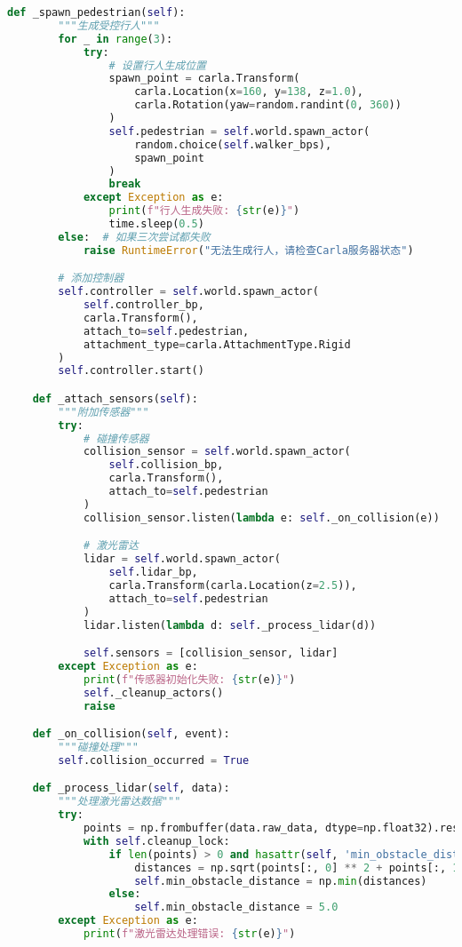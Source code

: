 \begin{lstlisting}[language=Python]
    def _spawn_pedestrian(self):
        """生成受控行人"""
        for _ in range(3):
            try:
                # 设置行人生成位置
                spawn_point = carla.Transform(
                    carla.Location(x=160, y=138, z=1.0),
                    carla.Rotation(yaw=random.randint(0, 360))
                )
                self.pedestrian = self.world.spawn_actor(
                    random.choice(self.walker_bps),
                    spawn_point
                )
                break
            except Exception as e:
                print(f"行人生成失败: {str(e)}")
                time.sleep(0.5)
        else:  # 如果三次尝试都失败
            raise RuntimeError("无法生成行人，请检查Carla服务器状态")

        # 添加控制器
        self.controller = self.world.spawn_actor(
            self.controller_bp,
            carla.Transform(),
            attach_to=self.pedestrian,
            attachment_type=carla.AttachmentType.Rigid
        )
        self.controller.start()

    def _attach_sensors(self):
        """附加传感器"""
        try:
            # 碰撞传感器
            collision_sensor = self.world.spawn_actor(
                self.collision_bp,
                carla.Transform(),
                attach_to=self.pedestrian
            )
            collision_sensor.listen(lambda e: self._on_collision(e))

            # 激光雷达
            lidar = self.world.spawn_actor(
                self.lidar_bp,
                carla.Transform(carla.Location(z=2.5)),
                attach_to=self.pedestrian
            )
            lidar.listen(lambda d: self._process_lidar(d))

            self.sensors = [collision_sensor, lidar]
        except Exception as e:
            print(f"传感器初始化失败: {str(e)}")
            self._cleanup_actors()
            raise

    def _on_collision(self, event):
        """碰撞处理"""
        self.collision_occurred = True

    def _process_lidar(self, data):
        """处理激光雷达数据"""
        try:
            points = np.frombuffer(data.raw_data, dtype=np.float32).reshape(-1, 4)
            with self.cleanup_lock:
                if len(points) > 0 and hasattr(self, 'min_obstacle_distance'):
                    distances = np.sqrt(points[:, 0] ** 2 + points[:, 1] ** 2)
                    self.min_obstacle_distance = np.min(distances)
                else:
                    self.min_obstacle_distance = 5.0
        except Exception as e:
            print(f"激光雷达处理错误: {str(e)}")


\end{lstlisting}
